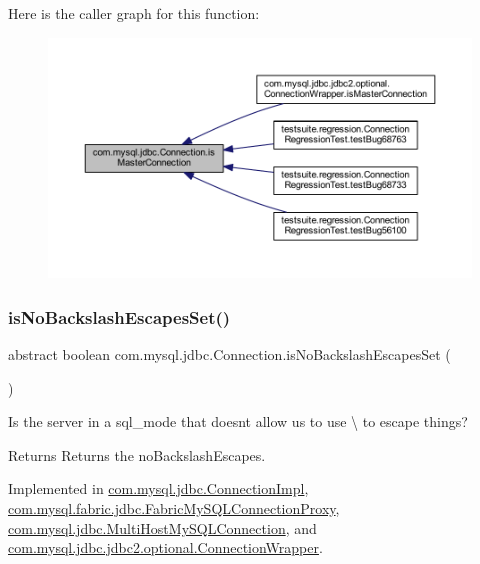 Here is the caller graph for this function\+:\nopagebreak
\begin{figure}[H]
\begin{center}
\leavevmode
\includegraphics[width=350pt]{interfacecom_1_1mysql_1_1jdbc_1_1_connection_a39d6c162da8f21b7c2a3299f91e7c65a_icgraph}
\end{center}
\end{figure}
\mbox{\label{interfacecom_1_1mysql_1_1jdbc_1_1_connection_a3465592f69365c9572cc404ae04375b4}} 
\subsubsection{\texorpdfstring{is\+No\+Backslash\+Escapes\+Set()}{isNoBackslashEscapesSet()}}
{\footnotesize\ttfamily abstract boolean com.\+mysql.\+jdbc.\+Connection.\+is\+No\+Backslash\+Escapes\+Set (\begin{DoxyParamCaption}{ }\end{DoxyParamCaption})\hspace{0.3cm}{\ttfamily [abstract]}}

Is the server in a sql\+\_\+mode that doesn\textquotesingle{}t allow us to use \textbackslash{} to escape things?

\begin{DoxyReturn}{Returns}
Returns the no\+Backslash\+Escapes. 
\end{DoxyReturn}


Implemented in \mbox{\hyperlink{classcom_1_1mysql_1_1jdbc_1_1_connection_impl_afe154ffa9d2d89f6a63cf352f86f357e}{com.\+mysql.\+jdbc.\+Connection\+Impl}}, \mbox{\hyperlink{classcom_1_1mysql_1_1fabric_1_1jdbc_1_1_fabric_my_s_q_l_connection_proxy_a80232087afb30150542cb3f36aa5d66b}{com.\+mysql.\+fabric.\+jdbc.\+Fabric\+My\+S\+Q\+L\+Connection\+Proxy}}, \mbox{\hyperlink{classcom_1_1mysql_1_1jdbc_1_1_multi_host_my_s_q_l_connection_a9647bf20f66e69d8a07a2f867957f7f2}{com.\+mysql.\+jdbc.\+Multi\+Host\+My\+S\+Q\+L\+Connection}}, and \mbox{\hyperlink{classcom_1_1mysql_1_1jdbc_1_1jdbc2_1_1optional_1_1_connection_wrapper_a75f9e3be6db60cb253060986aac46e4c}{com.\+mysql.\+jdbc.\+jdbc2.\+optional.\+Connection\+Wrapper}}.


